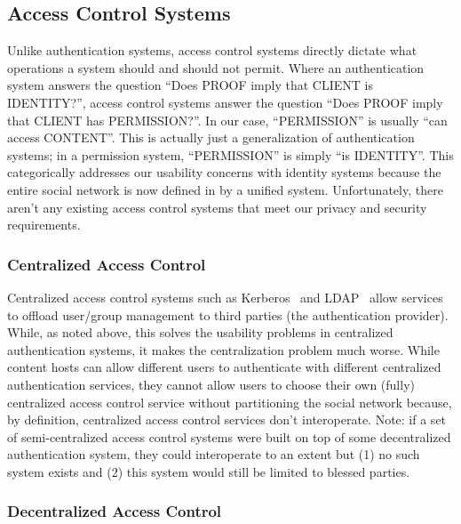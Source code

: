 \documentclass[pdftex,12pt,a4papaer,twoside,notitlepage]{report}
\begin{document}
\subsection{Access Control Systems}

Unlike authentication systems, access control systems directly dictate what
operations a system should and should not permit. Where an authentication system
answers the question ``Does PROOF imply that CLIENT is IDENTITY?'', access
control systems answer the question ``Does PROOF imply that CLIENT has
PERMISSION?''. In our case, ``PERMISSION'' is usually ``can access CONTENT''.
This is actually just a generalization of authentication systems; in a
permission system, ``PERMISSION'' is simply ``is IDENTITY''. This categorically
addresses our usability concerns with identity systems because the entire social
network is now defined in by a unified system. Unfortunately, there aren't any
existing access control systems that meet our privacy and security requirements.

\subsubsection{Centralized Access Control}

Centralized access control systems such as Kerberos~\cite{kerberos} and
LDAP~\cite{ldap} allow services to offload user/group management to third
parties (the authentication provider). While, as noted above, this solves the
usability problems in centralized authentication systems, it makes the
centralization problem much worse. While content hosts can allow different users
to authenticate with different centralized authentication services, they cannot
allow users to choose their own (fully) centralized access control service
without partitioning the social network because, by definition, centralized
access control services don't interoperate. Note: if a set of semi-centralized
access control systems were built on top of some decentralized authentication
system, they could interoperate to an extent but (1) no such system exists and
(2) this system would still be limited to blessed parties.

\subsubsection{Decentralized Access Control}
\end{document}
